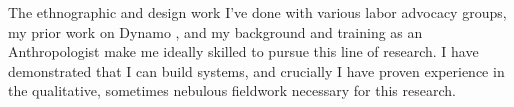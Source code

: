 \documentclass[12pt]{article}
\newcommand{\sectitle}[1]{\textbf{\MakeUppercase{#1}}}
\begin{document}
The ethnographic and design work I've done with various labor advocacy groups,
my prior work on Dynamo
\cite{dynamo},
and my background and training as an Anthropologist
make me ideally skilled to pursue this line of research.
I have demonstrated that I can build systems,
and crucially I have proven experience in the qualitative,
sometimes nebulous fieldwork necessary for this research.



\renewcommand\refname{\sectitle{references}}
% 

{\footnotesize

}
\end{document}
